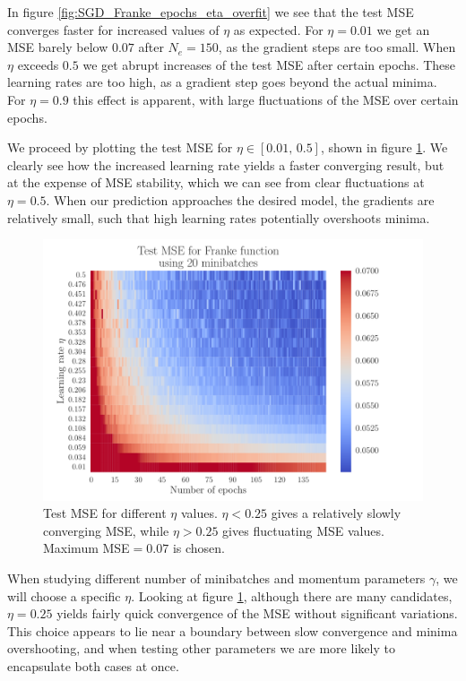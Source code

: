 \documentclass[12pt]{extarticle}
\begin{document}
In figure \ref{fig:SGD_Franke_epochs_eta_overfit} we see that the test MSE converges faster for increased values of $\eta$ as expected. For $\eta=0.01$ we get an MSE barely below $0.07$ after $N_e=150$, as the gradient steps are too small. When $\eta$ exceeds $0.5$ we get abrupt increases of the test MSE after certain epochs. These learning rates are too high, as a gradient step goes beyond the actual minima. For $\eta=0.9$ this effect is apparent, with large fluctuations of the MSE over certain epochs.

We proceed by plotting the test MSE for $\eta\in[0.01,\,0.5]$, shown in figure \ref{fig:SGD_Franke_epochs_eta}. We clearly see how the increased learning rate yields a faster converging result, but at the expense of MSE stability, which we can see from clear fluctuations at $\eta=0.5$. When our prediction approaches the desired model, the gradients are relatively small, such that high learning rates potentially overshoots minima.

\begin{figure}[h!]
	\includegraphics[width=0.9\linewidth]{SGD_Franke/reg_Franke__epochs_eta__Test_MSE__262224.pdf}
	\caption{Test MSE for different $\eta$ values. $\eta<0.25$ gives a relatively slowly converging MSE, while $\eta>0.25$ gives fluctuating MSE values. Maximum MSE$=0.07$ is chosen.}
	\label{fig:SGD_Franke_epochs_eta}
\end{figure}

When studying different number of minibatches and momentum parameters $\gamma$, we will choose a specific $\eta$. Looking at figure \ref{fig:SGD_Franke_epochs_eta}, although there are many candidates, $\eta=0.25$ yields fairly quick convergence of the MSE without significant variations. This choice appears to lie near a boundary between slow convergence and minima overshooting, and when testing other parameters we are more likely to encapsulate both cases at once.
\end{document}
